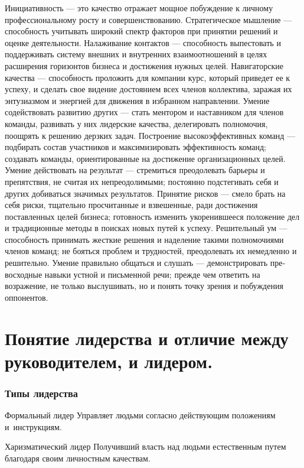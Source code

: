 \documentclass{../industrial-development}
\begin{document}
Инициативность — это качество отражает мощное побуждение к личному профессиональному росту и совершенствованию.
Стратегическое мышление — способность учитывать широкий спектр факторов при принятии решений и оценке деятельности.
Налаживание контактов — способность выпестовать и поддержи­вать систему внешних и внутренних взаимоотношений в целях расширения горизонтов бизнеса и достижения нужных целей.
Навигаторские качества — способность проложить для компа­нии курс, который приведет ее к успеху, и сделать свое видение достоянием всех членов коллектива, заражая их энтузиазмом и энергией для движения в избранном направлении.
Умение содействовать развитию других — стать ментором и на­ставником для членов команды, развивать у них лидерские каче­ства, делегировать полномочия, поощрять к решению дерзких задач.
Построение высокоэффективных команд — подбирать состав уча­стников и максимизировать эффективность команд; создавать команды, ориентированные на достижение организационных целей.
Умение действовать на результат — стремиться преодолевать барьеры и препятствия, не считая их непреодолимыми; постоян­но подстегивать себя и других добиваться значимых результатов.
Принятие рисков — смело брать на себя риски, тщательно про­считанные и взвешенные, ради достижения поставленных целей бизнеса; готовность изменить укоренившееся положение дел и традиционные методы в поисках новых путей к успеху.
Решительный ум — способность принимать жесткие решения и наделение такими полномочиями членов команд; не бояться про­блем и трудностей, преодолевать их немедленно и решительно.
Умение правильно общаться и слушать — демонстрировать пре­восходные навыки устной и письменной речи; прежде чем от­ветить на возражение, не только выслушивать, но и понять точку зрения и побуждения оппонентов.

\section{Понятие лидерства и отличие между руководителем, и лидером.}

\begin{frame} \frametitle{Типы лидерства}
 	  \begin{block}{Формальный лидер}
           Управляет людьми согласно действующим положениям и~инструкциям.
	  \end{block}

	  \begin{block}{Харизматический лидер}
          Получивший власть над людьми естественным путем благодаря своим личностным качествам.
	  \end{block}
\end{frame}
\end{document}
